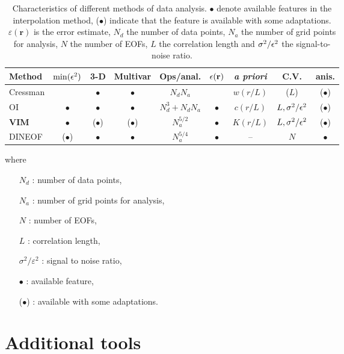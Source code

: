 \begin{table}[htpb]
\caption{Characteristics of different methods of data analysis. $\bullet$ denote available features in the interpolation method, ($\bullet$) indicate that the feature is available with some adaptations. $\varepsilon(\mathbf{r})$ is the error estimate, $N_d$ the number of data points, $N_a$ the number of grid points for analysis, $N$ the number of EOFs, $L$ the correlation length and $\sigma^2/ \epsilon^2$ the signal-to-noise ratio.\label{tabdata}}
\begin{tabular*}{0.99\textwidth}{@{\extracolsep{\fill}}lcccccccc}
\toprule
Method   & $\min(\epsilon^2)$	& 3-D       & Multivar & Ops/anal.        & $\epsilon(\mathbf{r})$& \textit{a priori}& C.V. & anis. \\ 
\midrule
Cressman &              	& $\bullet$& $\bullet$& $N_d N_a$        &                & $w(r/L)$   &($L$) & ($\bullet$) 			\\ 
OI    	 &   $\bullet$    	& $\bullet$& $\bullet$& $N_d^3+ N_d N_a$ & $\bullet$      & $c(r/L)$   & $L,\sigma^2/\epsilon^2$&($\bullet$)	\\ 
{\bf VIM}&   $\bullet$      &($\bullet$)& ($\bullet$)& $N_a^{5/2}$   & $\bullet$      & $K(r/L)$   & $L,\sigma^2/\epsilon^2$&($\bullet$)	\\
DINEOF   &  ($\bullet$)     & $\bullet$ &  $\bullet$ & $N_a^{5/4}$   & $\bullet$  	  &  --		   & $N$               & $\bullet$	\\ 
\bottomrule
\end{tabular*}
\end{table}
where 
\begin{itemize}
\item[$N_d$]: number of data points,
\item[$N_a$]: number of grid points for analysis,
\item[$N$]: number of EOFs,
\item[$L$]: correlation length,
\item[$\sigma^2/ \varepsilon^2$]: signal to noise ratio,
\item[$\bullet$]: available feature,
\item[($\bullet$)]: available with some adaptations.
\end{itemize}


\section{Additional tools}


